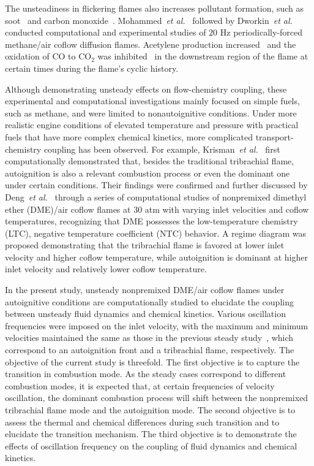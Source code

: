 \documentclass[review,3p,times]{elsarticle}
\begin{document}
The unsteadiness in flickering flames also increases pollutant formation, such as soot~\cite{shaddix94} and carbon monoxide~\cite{skaggs96}.  Mohammed~\emph{et al.}~\cite{mohammed98} followed by Dworkin~\emph{et al.}~\cite{dworkin07} conducted computational and experimental studies of $20$ Hz periodically-forced methane/air coflow diffusion flames.  Acetylene production increased~\cite{mohammed98} and the oxidation of CO to CO$_2$ was inhibited~\cite{dworkin07} in the downstream region of the flame at certain times during the flame's cyclic history.       

Although demonstrating unsteady effects on flow-chemistry coupling, these experimental and computational investigations mainly focused on simple fuels, such as methane, and were limited to nonautoignitive conditions.  Under more realistic engine conditions of elevated temperature and pressure with practical fuels that have more complex chemical kinetics, more complicated transport-chemistry coupling has been observed.  For example, Krisman~\emph{et al.}~\cite{krisman14} first computationally demonstrated that, besides the traditional tribrachial flame, autoignition is also a relevant combustion process or even the dominant one under certain conditions.  Their findings were confirmed and further discussed by Deng~\emph{et al.}~\cite{deng15,deng15b} through a series of computational studies of nonpremixed dimethyl ether (DME)/air coflow flames at $30$ atm with varying inlet velocities and coflow temperatures, recognizing that DME possesses the low-temperature chemistry (LTC), negative temperature coefficient (NTC) behavior.  A regime diagram was proposed demonstrating that the tribrachial flame is favored at lower inlet velocity and higher coflow temperature, while autoignition is dominant at higher inlet velocity and relatively lower coflow temperature.

In the present study, unsteady nonpremixed DME/air coflow flames under autoignitive conditions are computationally studied to elucidate the coupling between unsteady fluid dynamics and chemical kinetics.  Various oscillation frequencies were imposed on the inlet velocity, with the maximum and minimum velocities maintained the same as those in the previous steady study~\cite{deng15b}, which correspond to an autoignition front and a tribrachial flame, respectively.  The objective of the current study is threefold.  The first objective is to capture the transition in combustion mode.  As the steady cases correspond to different combustion modes, it is expected that, at certain frequencies of velocity oscillation, the dominant combustion process will shift between the nonpremixed tribrachial flame mode and the autoignition mode.  The second objective is to assess the thermal and chemical differences during such transition and to elucidate the transition mechanism.  The third objective is to demonstrate the effects of oscillation frequency on the coupling of fluid dynamics and chemical kinetics.               
\end{document}
